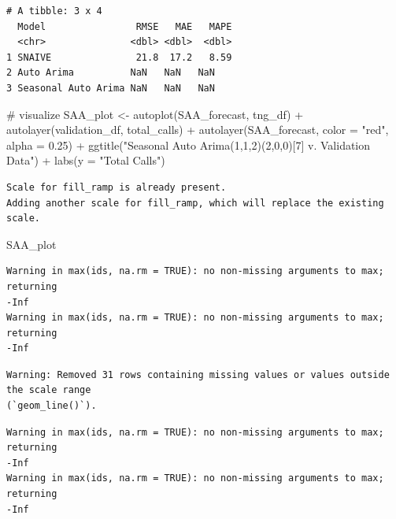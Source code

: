 \documentclass[
  letterpaper,
  DIV=11,
  numbers=noendperiod]{scrartcl}
\newenvironment{Shaded}{\begin{snugshade}}{\end{snugshade}}
\newcommand{\AttributeTok}[1]{\textcolor[rgb]{0.40,0.45,0.13}{#1}}
\newcommand{\CommentTok}[1]{\textcolor[rgb]{0.37,0.37,0.37}{#1}}
\newcommand{\FloatTok}[1]{\textcolor[rgb]{0.68,0.00,0.00}{#1}}
\newcommand{\FunctionTok}[1]{\textcolor[rgb]{0.28,0.35,0.67}{#1}}
\newcommand{\NormalTok}[1]{\textcolor[rgb]{0.00,0.23,0.31}{#1}}
\newcommand{\OtherTok}[1]{\textcolor[rgb]{0.00,0.23,0.31}{#1}}
\newcommand{\SpecialCharTok}[1]{\textcolor[rgb]{0.37,0.37,0.37}{#1}}
\newcommand{\StringTok}[1]{\textcolor[rgb]{0.13,0.47,0.30}{#1}}
\begin{document}
\begin{verbatim}
# A tibble: 3 x 4
  Model                RMSE   MAE   MAPE
  <chr>               <dbl> <dbl>  <dbl>
1 SNAIVE               21.8  17.2   8.59
2 Auto Arima          NaN   NaN   NaN   
3 Seasonal Auto Arima NaN   NaN   NaN   
\end{verbatim}

\begin{Shaded}
\begin{Highlighting}[]
\CommentTok{\# visualize}
\NormalTok{SAA\_plot }\OtherTok{\textless{}{-}} \FunctionTok{autoplot}\NormalTok{(SAA\_forecast, tng\_df) }\SpecialCharTok{+} 
  \FunctionTok{autolayer}\NormalTok{(validation\_df, total\_calls) }\SpecialCharTok{+} 
  \FunctionTok{autolayer}\NormalTok{(SAA\_forecast, }\AttributeTok{color =} \StringTok{"red"}\NormalTok{, }\AttributeTok{alpha =} \FloatTok{0.25}\NormalTok{) }\SpecialCharTok{+}
  \FunctionTok{ggtitle}\NormalTok{(}\StringTok{"Seasonal Auto Arima(1,1,2)(2,0,0)[7] v. Validation Data"}\NormalTok{) }\SpecialCharTok{+} 
  \FunctionTok{labs}\NormalTok{(}\AttributeTok{y =} \StringTok{"Total Calls"}\NormalTok{)}
\end{Highlighting}
\end{Shaded}

\begin{verbatim}
Scale for fill_ramp is already present.
Adding another scale for fill_ramp, which will replace the existing scale.
\end{verbatim}

\begin{Shaded}
\begin{Highlighting}[]
\NormalTok{SAA\_plot}
\end{Highlighting}
\end{Shaded}

\begin{verbatim}
Warning in max(ids, na.rm = TRUE): no non-missing arguments to max; returning
-Inf
Warning in max(ids, na.rm = TRUE): no non-missing arguments to max; returning
-Inf
\end{verbatim}

\begin{verbatim}
Warning: Removed 31 rows containing missing values or values outside the scale range
(`geom_line()`).
\end{verbatim}

\begin{verbatim}
Warning in max(ids, na.rm = TRUE): no non-missing arguments to max; returning
-Inf
Warning in max(ids, na.rm = TRUE): no non-missing arguments to max; returning
-Inf
\end{verbatim}
\end{document}

